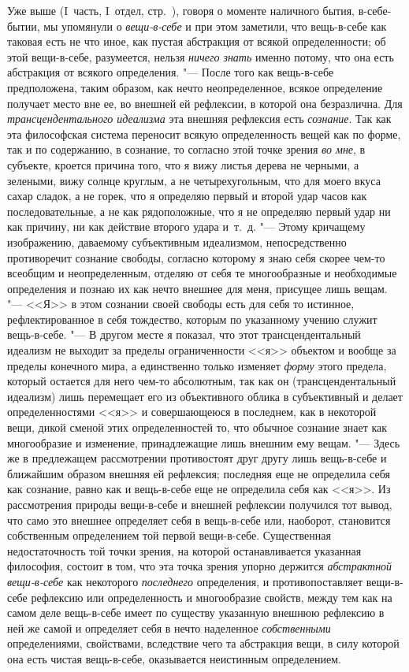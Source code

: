 Уже выше (I~часть, I~отдел, стр.~\pageref{bkm:bmThingInItself}), говоря о
моменте наличного бытия, в-себе-бытии, мы упомянули о
{\em вещи-в-себе} и при этом заметили, что вещь-в-себе
как таковая есть не что иное, как пустая абстракция от всякой
определенности; об этой вещи-в-себе, разумеется, нельзя
{\em ничего знать} именно потому, что она есть
абстракция от всякого определения. "--- После того как вещь-в-себе
предположена, таким образом, как нечто неопределенное, всякое определение
получает место вне ее, во внешней ей рефлексии, в которой она безразлична.
Для {\em трансцендентального идеализма} эта внешняя
рефлексия есть {\em сознание}. Так как эта философская
система переносит всякую определенность вещей как по форме, так и по
содержанию, в сознание, то согласно этой точке зрения
{\em во мне}, в субъекте, кроется причина того, что я
вижу листья дерева не черными, а зелеными, вижу солнце круглым, а не
четырехугольным, что для моего вкуса сахар сладок, а не горек, что я
определяю первый и второй удар часов как последовательные, а не как
рядоположные, что я не определяю первый удар ни как причину, ни как
действие второго удара и~т.~д. "--- Этому кричащему изображению, даваемому
субъективным идеализмом, непосредственно противоречит сознание свободы,
согласно которому я знаю себя скорее чем-то всеобщим и неопределенным,
отделяю от себя те многообразные и необходимые определения и познаю их как
нечто внешнее для меня, присущее лишь вещам. "--- <<Я>> в этом сознании своей
свободы есть для себя то истинное, рефлектированное в себя тождество,
которым по указанному учению служит вещь-в-себе. "--- В другом месте я
показал, что этот трансцендентальный идеализм не выходит за пределы
ограниченности <<я>> объектом и вообще за пределы конечного мира, а
единственно только изменяет {\em форму} этого предела,
который остается для него чем-то абсолютным, так как он (трансцендентальный
идеализм) лишь перемещает его из объективного облика в субъективный и
делает определенностями <<я>> и совершающеюся в последнем, как в некоторой
вещи, дикой сменой этих определенностей то, что обычное сознание знает как
многообразие и изменение, принадлежащие лишь внешним ему вещам. "--- Здесь же
в предлежащем рассмотрении противостоят друг другу лишь вещь-в-себе и
ближайшим образом внешняя ей рефлексия; последняя еще не определила себя
как сознание, равно как и вещь-в-себе еще не определила себя как <<я>>. Из
рассмотрения природы вещи-в-себе и внешней рефлексии получился тот вывод,
что само это внешнее определяет себя в вещь-в-себе или, наоборот,
становится собственным определением той первой вещи-в-себе. Существенная
недостаточность той точки зрения, на которой останавливается указанная
философия, состоит в том, что эта точка зрения упорно держится
{\em абстрактной вещи-в-себе} как некоторого
{\em последнего} определения, и противопоставляет
вещи-в-себе рефлексию или определенность и многообразие свойств, между тем
как на самом деле вещь-в-себе имеет по существу указанную внешнюю рефлексию
в ней же самой и определяет себя в нечто наделенное
{\em собственными} определениями, свойствами,
вследствие чего та абстракция вещи, в силу которой она есть чистая
вещь-в-себе, оказывается неистинным определением.

